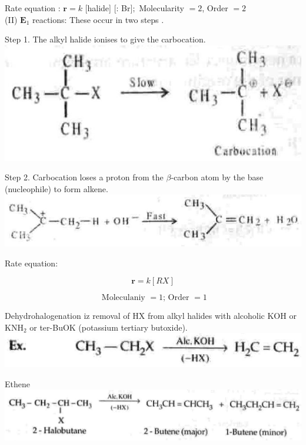 \documentclass[10pt]{article}
\begin{document}
Rate equation : $\mathbf{r}=k$ [halide] [: Br$] ;$ Molecularity $=2$, Order $=2$\\
(II) $\mathbf{E}_{1}$ reactions: These occur in two steps .

Step 1. The alkyl halide ionises to give the carbocation.\\
\includegraphics[max width=\textwidth, center]{2025_01_28_8470952b98110cec3aabg-099(2)}

Step 2. Carbocation loses a proton from the $\beta$-carbon atom by the base (nucleophile) to form alkene.\\
\includegraphics[max width=\textwidth, center]{2025_01_28_8470952b98110cec3aabg-099}

Rate equation:

$$
\mathbf{r}=k[R X]
$$

$$
\text { Moleculaniy }=1 \text {; Order }=1
$$

Dehydrohalogenation iz removal of HX from alkyl halides with alcoholic KOH or $\mathrm{KNH}_{2}$ or ter-BuOK (potassium tertiary butoxide).\\
\includegraphics[max width=\textwidth, center]{2025_01_28_8470952b98110cec3aabg-100(7)}

Ethene\\
\includegraphics[max width=\textwidth, center]{2025_01_28_8470952b98110cec3aabg-100(5)}
\end{document}
